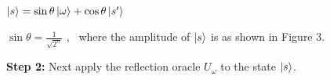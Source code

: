 \documentclass{article}
\begin{document}
\qquad $\ket{s} = \sin\theta\ket{\omega} + \cos\theta\ket{s'}$
\vspace{5mm}

\qquad $\sin\theta = \frac{1}{\sqrt{2^n}}$ , \ where the amplitude of $\ket{s}$ is as shown in Figure 3.
\vspace{5mm}

\textbf{Step 2:}
\vspace{5mm}
Next apply the reflection oracle $U_\omega$ to the state $\ket{s}$.
\vspace{5mm}


\begin{figure}[h]
  
  \begin{tikzpicture}[x=0.75pt,y=0.75pt,yscale=-1,xscale=1]
    

\end{tikzpicture}
\end{figure}
\end{document}
